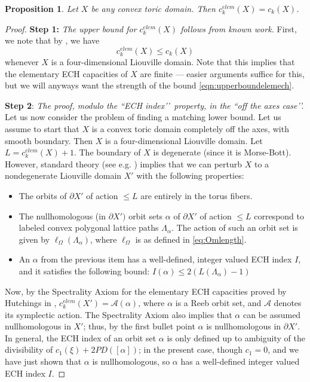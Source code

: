 \documentclass[11pt, reqno]{amsart}
\newtheorem{prop}[thm]{Proposition}
\theoremstyle{remark}
\numberwithin{equation}{subsection}
\numberwithin{figure}{section}
\theoremstyle{customremark}
\newcommand{\NI}{{\noindent}}
\newcommand{\MS}{{\medskip}}
\begin{document}
\begin{prop}\label{prop:elem}
Let $X$ be any convex toric domain.  Then $c^{elem}_k(X) = c_k(X)$.
\end{prop}
\begin{proof}

\vspace{3 mm}

\NI {\bf Step 1:} {\it
The upper bound for $c^{elem}_k(X)$ follows from known work.}  First, we note that by \cite[Thm. 6.1]{Helem},
 we have
\begin{equation}
\label{eqn:upperboundelemech} 
c^{elem}_k(X) \le c_k(X)
\end{equation}
whenever $X$ is a four-dimensional Liouville domain.   Note that this implies that the elementary ECH capacities of $X$ are finite --- easier arguments  suffice for this, but we will anyways want the strength of the bound \eqref{eqn:upperboundelemech}.  
\MS
  

\NI
{\bf Step 2}: {\it  The proof, modulo the ``ECH index\rq\rq\, property, in the ``off the axes case\rq\rq. } 
Let us now consider the problem of finding a matching lower bound.  Let us assume to start that $X$ is a convex toric domain completely off the axes, with smooth boundary.
Then $X$ is a four-dimensional Liouville domain.  Let $L = c^{elem}_k(X) + 1.$ The boundary of $X$ is degenerate (since it is Morse-Bott).  However, standard theory (see e.g. \cite{Hutchq}) implies that we can perturb $X$ to a nondegenerate Liouville domain $X'$ with the following properties:
\begin{itemize}
\item The orbits of $\partial X'$ of action $\le L$ are entirely in the torus fibers.  
\item The nullhomologous (in $\partial X')$ orbit sets $\alpha$ of $\partial X'$ of action $\le L$ correspond to labeled convex polygonal lattice paths $\Lambda_{\alpha}$.    The action of such an orbit set is given by $\ell_{\Omega} (\Lambda_{\alpha})$, where $\ell_\Omega$ is as defined in \eqref{eq:Omlength}.
\item An $\alpha$ from the previous item has a well-defined, integer valued ECH index $I$, and it satisfies the following bound: $I(\alpha) \le 2(L(\Lambda_{\alpha}) - 1)$ 
\end{itemize}

Now, by the Spectrality Axiom for the elementary ECH capacities proved by Hutchings in 
\cite[Thm. 4.1]{Helem},
$c^{elem}_k(X') = \mathcal{A}(\alpha)$, where $\alpha$ is a Reeb orbit set, and $\mathcal{A}$ denotes its symplectic action.  The Spectrality Axiom also implies that $\alpha$ can be assumed  nullhomologous in $X'$; thus, by the first bullet point $\alpha$ is nullhomologous in $\partial X'$.  In general, the ECH index of an orbit set $\alpha$ is only defined up to ambiguity of the divisibility of $c_1(\xi) + 2 PD([\alpha])$; in the present case, though $c_1 = 0$, and we have just shown that $\alpha$ is nullhomologous, so $\alpha$ has a well-defined integer valued ECH index $I$.


\end{proof}
\end{document}
